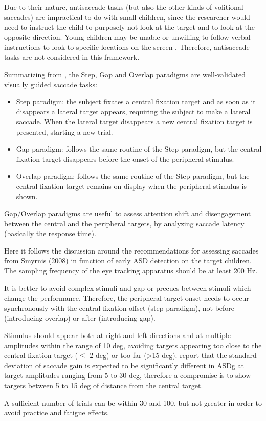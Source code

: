 Due to their nature, antisaccade tasks (but also the other kinds of volitional saccades) are impractical to do with small children, since the researcher would need to instruct the child to purposely not look at the target and to look at the opposite direction. Young children may be unable or unwilling to follow verbal instructions to look to specific locations on the screen \citep{sasson2012children}. Therefore, antisaccade tasks are not considered in this framework.

Summarizing from \cite{zalla2016saccades}, the Step, Gap and Overlap paradigms are well-validated visually guided saccade tasks:
\begin{itemize}
    \item Step paradigm: the subject fixates a central fixation target and as soon as it disappears a lateral target appears, requiring the subject to make a lateral saccade. When the lateral target disappears a new central fixation target is presented, starting a new trial. 
    \item Gap paradigm: follows the same routine of the Step paradigm, but the central fixation target disappears before the onset of the peripheral stimulus.
    \item Overlap paradigm: follows the same routine of the Step paradigm, but the central fixation target remains on display when the peripheral stimulus is shown.
\end{itemize}

Gap/Overlap paradigms are useful to assess attention shift and disengagement between the central and the peripheral targets, by analyzing saccade latency (basically the response time). 

Here it follows the discussion around the recommendations for assessing saccades from Smyrnis (2008) in function of early ASD detection on the target children.
The sampling frequency of the eye tracking apparatus should be at least 200 Hz.

It is better to avoid complex stimuli and gap or precues between stimuli which change the performance. Therefore, the peripheral target onset needs to occur synchronously with the central fixation offset (step paradigm), not before (introducing overlap) or after (introducing gap).

Stimulus should appear both at right and left directions and at multiple amplitudes within the range of 10 deg, avoiding targets appearing too close to the central fixation target (\(\leq\) 2 deg) or too far (\textgreater 15 deg). \cite{johnson2016review} report that the standard deviation of saccade gain is expected to be significantly different in ASDg at target amplitudes ranging from 5 to 30 deg, therefore a compromise is to show targets between 5 to 15 deg of distance from the central target.

A sufficient number of trials can be within 30 and 100, but not greater in order to avoid practice and fatigue effects.
